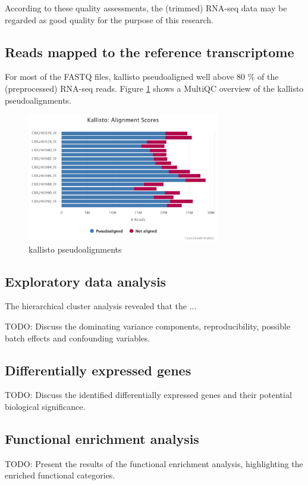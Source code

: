 According to these quality assessments, the (trimmed) RNA-seq data may be regarded as good quality for the purpose of this research.


\subsection{Reads mapped to the reference transcriptome}

For most of the FASTQ files, kallisto pseudoaligned well above 80 \% of the (preprocessed) RNA-seq reads. Figure \ref{fig:0.3-MultiQC_kallisto_alignment} shows a MultiQC overview of the kallisto pseudoalignments.

\begin{figure}[htbp]
    \caption{kallisto pseudoalignments}
    \label{fig:0.3-MultiQC_kallisto_alignment}
    \includegraphics[width=0.75\textwidth]{../../results/multiqc/Plot-Exports/kallisto_alignment}
\end{figure}


\subsection{Exploratory data analysis}

The hierarchical cluster analysis  revealed that the ...

TODO: Discuss the dominating variance components, reproducibility, possible batch effects and confounding variables.

\subsection{Differentially expressed genes}

TODO: Discuss the identified differentially expressed genes and their potential biological significance.

\subsection{Functional enrichment analysis}

TODO: Present the results of the functional enrichment analysis, highlighting the enriched functional categories.